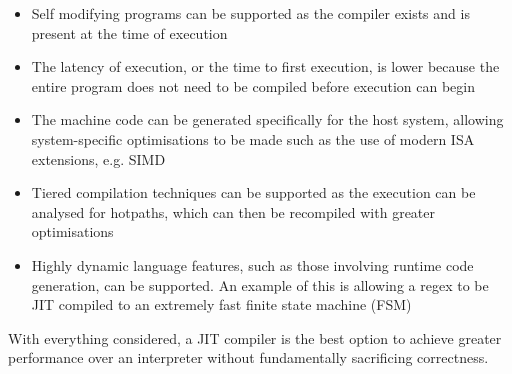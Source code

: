 \begin{itemize}
	\item Self modifying programs can be supported as the compiler exists and is present at the time of execution
	\item The latency of execution, or the time to first execution, is lower because the entire program does not need to be compiled before execution can begin
	\item The machine code can be generated specifically for the host system, allowing system-specific optimisations to be made such as the use of modern ISA extensions, e.g. SIMD
	\item Tiered compilation techniques can be supported as the execution can be analysed for hotpaths, which can then be recompiled with greater optimisations
	\item Highly dynamic language features, such as those involving runtime code generation, can be supported. An example of this is allowing a regex to be JIT compiled to an extremely fast finite state machine (FSM)
\end{itemize}

With everything considered, a JIT compiler is the best option to achieve greater performance over an interpreter without fundamentally sacrificing correctness.
